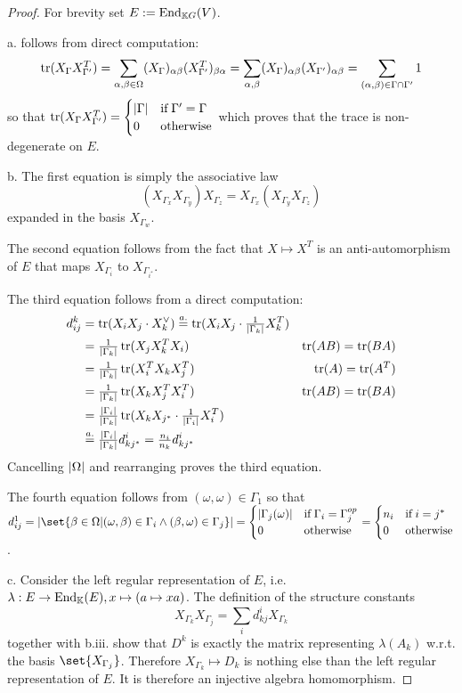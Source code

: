 \documentclass[fontsize=11pt,fleqn,a4paper]{scrartcl}
\begin{document}
\begin{proof}
For brevity set $E:=\operatorname{End}_{\mathbb{K} G}(V)$.

a. follows from direct computation:
\[\operatorname{tr}(X_\Gamma X_{\Gamma'}^T) = \sum_{\alpha,\beta\in\Omega} (X_\Gamma)_{\alpha\beta} (X_{\Gamma'}^T)_{\beta\alpha} = \sum_{\alpha,\beta} (X_\Gamma)_{\alpha\beta} (X_{\Gamma'})_{\alpha\beta} = \sum_{(\alpha,\beta) \in \Gamma \cap\Gamma'} 1\]
so that $\operatorname{tr}(X_\Gamma X_{\Gamma'}^T) = \begin{cases} \lvert\Gamma\rvert & \text{if}\;\Gamma'=\Gamma \\ 0 & \text{otherwise}\end{cases}$ which proves that the trace is non-degenerate on $E$.

\medbreak
b. The first equation is simply the associative law
\[(X_{\Gamma_x} X_{\Gamma_y}) X_{\Gamma_z} = X_{\Gamma_x} (X_{\Gamma_y} X_{\Gamma_z})\]
expanded in the basis $X_{\Gamma_w}$.

The second equation follows from the fact that $X\mapsto X^T$ is an anti-automorphism of $E$ that maps $X_{\Gamma_i}$ to $X_{\Gamma_{i^\ast}}$.

The third equation follows from a direct computation:
\begin{align*}
d_{ij}^k &= \operatorname{tr}(X_iX_j \cdot X_k^\vee) \overset{a.}{=} \operatorname{tr}( X_i X_j \cdot \tfrac{1}{\lvert\Gamma_k\rvert}X_k^T) \\
&= \tfrac{1}{\lvert\Gamma_k\rvert}\operatorname{tr}(X_j X_k^T X_i) & \operatorname{tr}(AB)=\operatorname{tr}(BA) \\
&= \tfrac{1}{\lvert\Gamma_k\rvert}\operatorname{tr}(X_i^T X_k X_j^T) & \operatorname{tr}(A)=\operatorname{tr}(A^T) \\
&= \tfrac{1}{\lvert\Gamma_k\rvert}\operatorname{tr}(X_k X_j^T X_i^T ) & \operatorname{tr}(AB)=\operatorname{tr}(BA) \\
&= \tfrac{\lvert\Gamma_i\rvert}{\lvert\Gamma_k\rvert}\operatorname{tr}(X_k X_{j^\ast} \cdot  \tfrac{1}{\lvert\Gamma_i\rvert}X_i^T ) & \\
&\overset{a.}{=} \tfrac{\lvert\Gamma_i\rvert}{\lvert\Gamma_k\rvert} d_{kj^\ast}^i = \tfrac{n_i}{n_k} d_{kj^\ast}^i
\end{align*}
Cancelling $\lvert\Omega\rvert$ and rearranging proves the third equation.

The fourth equation follows from $(\omega,\omega)\in\Gamma_1$ so that $d_{ij}^1 = \abs{\set{\beta\in\Omega | (\omega,\beta)\in\Gamma_i \wedge (\beta,\omega)\in\Gamma_j}} = \begin{cases} \abs{\Gamma_j(\omega)} & \text{if}\;\Gamma_i=\Gamma_j^{op} \\ 0 &\text{otherwise}\end{cases} = \begin{cases} n_i & \text{if}\;i=j^\ast \\ 0 &\text{otherwise}\end{cases}$.

\medbreak
c. Consider the left regular representation of $E$, i.e. $\lambda: E\to\operatorname{End}_{\mathbb{K}}(E), x\mapsto(a\mapsto xa)$. The definition of the structure constants
\[X_{\Gamma_k} X_{\Gamma_j} = \sum_i d_{kj}^i X_{\Gamma_k}\]
together with b.iii. show that $D^k$ is exactly the matrix representing $\lambda(A_k)$ w.r.t. the basis $\set{X_{\Gamma_j}}$. Therefore $X_{\Gamma_k} \mapsto D_k$ is nothing else than the left regular representation of $E$. It is therefore an injective algebra homomorphism.
\end{proof}
\end{document}
